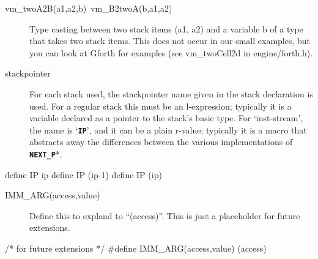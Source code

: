 \documentclass[10pt,english]{article}
\begin{document}
\begin{description}
\item [{vm\_twoA2B(a1,a2,b)~vm\_B2twoA(b,a1,a2)}] Type casting between
two stack items (a1, a2) and a variable b of a type that takes two
stack items. This does not occur in our small examples, but you can
look at Gforth for examples (see vm\_twoCell2d in engine/forth.h).
\item [{stackpointer}] For each stack used, the stackpointer name given
in the stack declaration is used. For a regular stack this must be
an l-expression; typically it is a variable declared as a pointer
to the stack's basic type. For \textquoteleft{}inst-stream\textquoteright{},
the name is \textquoteleft{}\texttt{\textbf{IP}}\textquoteright{},
and it can be a plain r-value; typically it is a macro that abstracts
away the differences between the various implementations of \texttt{\textbf{NEXT\_P}}{*}.
\end{description}
\nwenddocs{}\endmoddef
define IP            ip
\nwendcode{}\nwdocspar
\nwenddocs{}\endmoddef
define IP            (ip-1)
\nwendcode{}\nwdocspar
\nwenddocs{}\endmoddef
define IP            (ip)
\nwendcode{}\nwdocspar

\begin{description}
\item [{IMM\_ARG(access,value)}] Define this to expland to \textquotedblleft{}(access)\textquotedblright{}.
This is just a placeholder for future extensions.
\end{description}
\nwenddocs{}\endmoddef
/* for future extensions */
#define IMM_ARG(access,value) (access)
\nwendcode{}\nwdocspar
\end{document}
